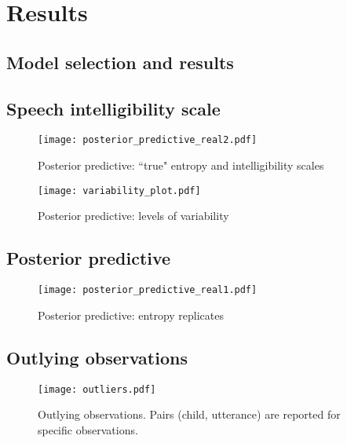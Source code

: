 \section{Results} \label{S:results}
%
\subsection{Model selection and results} \label{sS:results_models}
%

\subsection{Speech intelligibility scale} \label{sS:results_scales}
%

%
\begin{figure}
	\centering
	\texttt{[image: posterior\_predictive\_real2.pdf]}
	\caption[Posterior predictive: ``true'' entropy and intelligibility scales]{Posterior predictive: ``true" entropy and intelligibility scales}
	\label{fig:predictive2}
\end{figure}
%
\begin{figure}
	\centering
	\texttt{[image: variability\_plot.pdf]}
	\caption[Posterior predictive: levels of variability]{Posterior predictive: levels of variability}
	\label{fig:variability}
\end{figure}
%
%
\subsection{Posterior predictive} \label{sS:results_posterior}
%

%
\begin{figure}
	\centering
	\texttt{[image: posterior\_predictive\_real1.pdf]}
	\caption[Posterior predictive: entropy replicates]{Posterior predictive: entropy replicates}
	\label{fig:predictive1}
\end{figure}
%
%
\subsection{Outlying observations} \label{sS:results_outliers}
%

%
\begin{figure}
	\centering
	\texttt{[image: outliers.pdf]}
	\caption[Outlying observations]{Outlying observations. Pairs (child, utterance) are reported for specific observations.}
	\label{fig:outliers}
\end{figure}
%
%



